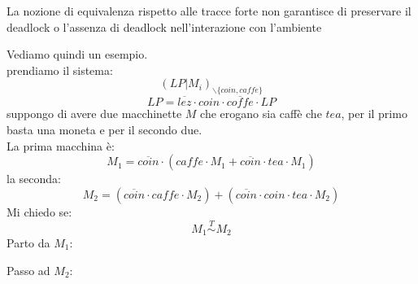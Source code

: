 \begin{definizione}
  La nozione di equivalenza rispetto alle tracce forte non garantisce di
  preservare il deadlock o l'assenza di deadlock nell'interazione con l'ambiente
\end{definizione} \vspace{5mm} %
\begin{esempio}
  Vediamo quindi un esempio.\\
  prendiamo il sistema:
  \[(LP|M_i)_{\backslash\{coin, caffe\}}\]
  \[LP=\overline{lez}\cdot coin\cdot \overline{coffe}\cdot LP\]
  suppongo di avere due macchinette $M$ che erogano sia caffè che $tea$, per il
  primo basta una moneta e per il secondo due.\\
  La prima macchina è:
  \[M_1=\overline{coin}\cdot(caffe\cdot M_1+\overline{coin}\cdot tea\cdot M_1)\]
  la seconda:
  \[M_2=(\overline{coin}\cdot caffe\cdot M_2)+(\overline{coin}\cdot coin \cdot
    tea\cdot M_2)\]
  Mi chiedo se:
  \[M_1\stackrel{T}{\sim} M_2\]
  Parto da $M_1$:
  \begin{center}
  \end{center}
  Passo ad $M_2$:
   \begin{center}
\end{center}
\end{esempio}
